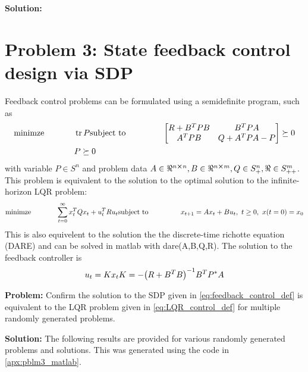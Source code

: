 \documentclass[letter]{article}
\begin{document}
\textbf{Solution:}








\newpage
\section{Problem 3: State feedback control design via SDP}
Feedback control problems can be formulated using a semidefinite program, such as
\begin{equation}\label{eq:feedback_control_def}
	\begin{aligned}
		\text{minimze} \hspace{0.5in}& \trace{P}
		\text{subject to} \hspace{0.5in}
		& \mqty [R + B^T PB & B^T PA\\
				 A^T PB & Q + A^T P A - P] \succeq 0\\
				 & P \succeq 0
	\end{aligned}
\end{equation}
with variable $P \in S^n$ and problem data $A\in \real^{n\cross n}, B \in\real^{n\cross m}, Q \in S^n_+, \real \in S^m_{++}$.\\

This problem is equivalent to the solution to the optimal solution to the infinite-horizon LQR problem:
\begin{equation}\label{eq:LQR_control_def}
	\begin{aligned}
		\text{minimze} \hspace{0.5in}& \sum_{t=0}^\infty x_t^T Q x_t + u_t^T R u_t
		\text{subject to} \hspace{0.5in}
		& x_{t+1} = Ax_t + B u_t, \ t \geq 0, \ x(t=0) = x_0
	\end{aligned}
\end{equation}
This is also equivelent to the solution the the discrete-time richotte equation (DARE) and can be solved in matlab with dare(A,B,Q,R). The solution to the feedback controller is
\begin{equation}\label{eq:LQR_control_solution}
	u_t = K x_t\\
	K = -\qty(R + B^T B)^{-1} B^T P^* A
\end{equation}

\textbf{Problem:}
Confirm the solution to the SDP given in \eqref{eq:feedback_control_def} is equivalent to the LQR problem given in \eqref{eq:LQR_control_def} for multiple randomly generated problems.

\textbf{Solution:}
The following results are provided for various randomly generated problems and solutions. This was generated using the code in \appendixname \ref{apx:pblm3_matlab}.
\end{document}
